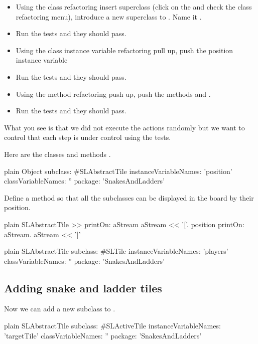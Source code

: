 \documentclass[10pt,twoside,english]{_support/latex/sbabook/sbabook}
\begin{document}
\begin{itemize}
\item Using the class refactoring insert superclass (click on the  and check the class refactoring menu), introduce a new superclass to . Name it . 
\item Run the tests and they should pass.
\item Using the class instance variable refactoring pull up, push the position instance variable
\item Run the tests and they should pass.
\item Using the method refactoring push up, push the methods  and .
\item Run the tests and they should pass.
\end{itemize}

What you see is that we did not execute the actions randomly but we want to control that each step is under control using the tests.

Here are the classes and methods .

\begin{displaycode}{plain}
Object subclass: #SLAbstractTile
	instanceVariableNames: 'position'
	classVariableNames: ''
	package: 'SnakesAndLadders'
\end{displaycode}

Define a  method so that all the subclasses can be displayed in the board by their position.

\begin{displaycode}{plain}
SLAbstractTile >> printOn: aStream
	aStream << '['.
	position printOn: aStream.
	aStream << ']'
\end{displaycode}

\begin{displaycode}{plain}
SLAbstractTile subclass: #SLTile
	instanceVariableNames: 'players'
	classVariableNames: ''
	package: 'SnakesAndLadders'
\end{displaycode}
\subsection{Adding snake and ladder tiles}
Now we can add a new subclass to .

\begin{displaycode}{plain}
SLAbstractTile subclass: #SLActiveTile
	instanceVariableNames: 'targetTile'
	classVariableNames: ''
	package: 'SnakesAndLadders'
\end{displaycode}
\end{document}
